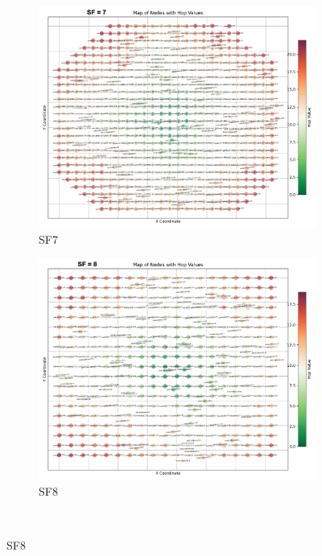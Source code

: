 \begin{figure}[ht!]

    \centering
    \begin{subfigure}{0.45\linewidth}
        \includegraphics[width=\linewidth]{images/nodeplacement1.png}
        \caption{SF7}
    \end{subfigure}
    \hfill
    \begin{subfigure}{0.45\linewidth}
        \includegraphics[width=\linewidth]{images/nodeplacement2.png}
        \caption{SF8}
    \end{subfigure}
    \\

\end{figure}
